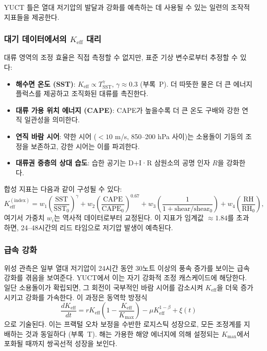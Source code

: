 \documentclass[11pt,a4paper]{article}
\newcommand{\Keff}{K_{\mathrm{eff}}}
\begin{document}
	YUCT 틀은 열대 저기압의 발달과 강화를 예측하는 데 사용될 수 있는 일련의 조작적 지표들을 제공한다.
	
	\subsubsection*{대기 데이터에서의 $K_{\mathrm{eff}}$ 대리}
	
	대류 영역의 조정 효율은 직접 측정할 수 없지만, 표준 기상 변수로부터 추정할 수 있다:
	\begin{itemize}
		\item \textbf{해수면 온도 (SST)}: $K_{\mathrm{eff}} \propto T_{\mathrm{SST}}^{\gamma}$, $\gamma \approx 0.3$ (부록~P). 더 따뜻한 물은 더 큰 에너지 플럭스를 제공하고 조직화된 대류를 촉진한다.
		\item \textbf{대류 가용 위치 에너지 (CAPE)}: CAPE가 높을수록 더 큰 온도 구배와 강한 연직 일관성을 의미한다.
		\item \textbf{연직 바람 시어}: 약한 시어 ($< 10$ m/s, 850–200 hPa 사이)는 소용돌이 기둥의 조정을 보존하고, 강한 시어는 이를 파괴한다.
		\item \textbf{대류권 중층의 상대 습도}: 습한 공기는 D+I·R 삼원소의 공명 인자 $R$을 강화한다.
	\end{itemize}
	합성 지표는 다음과 같이 구성될 수 있다:
	\[
	\Keff^{\mathrm{(index)}} = w_1 \left( \frac{\mathrm{SST}}{\mathrm{SST}_0} \right)^{\gamma}
	+ w_2 \left( \frac{\mathrm{CAPE}}{\mathrm{CAPE}_0} \right)^{0.67}
	+ w_3 \left( \frac{1}{1 + \mathrm{shear}/\mathrm{shear}_0} \right)
	+ w_4 \left( \frac{\mathrm{RH}}{\mathrm{RH}_0} \right),
	\]
	여기서 가중치 $w_i$는 역사적 데이터로부터 교정된다. 이 지표가 임계값 $\approx 1.84$를 초과하면, 24--48시간의 리드 타임으로 저기압 발생이 예측된다.
	
	\subsubsection*{급속 강화}
	
	위성 관측은 일부 열대 저기압이 24시간 동안 30노트 이상의 풍속 증가를 보이는 급속 강화를 겪음을 보여준다. YUCT에서 이는 자기 강화적 조정 캐스케이드에 해당한다. 일단 소용돌이가 확립되면, 그 회전이 국부적인 바람 시어를 감소시켜 $\Keff$을 더욱 증가시키고 강화를 가속한다. 이 과정은 동역학 방정식
	\[
	\frac{d\Keff}{dt} = r \Keff \left( 1 - \frac{\Keff}{K_{\max}} \right)
	- \mu \Keff^{1-\beta} + \xi(t)
	\]
	으로 기술된다. 이는 프랙털 오차 보정을 수반한 로지스틱 성장으로, 모든 조정계를 지배하는 것과 동일하다 (부록~T). 해는 가용한 해양 에너지에 의해 설정되는 $K_{\max}$에서 포화될 때까지 쌍곡선적 성장을 보인다.
	
\end{document}
